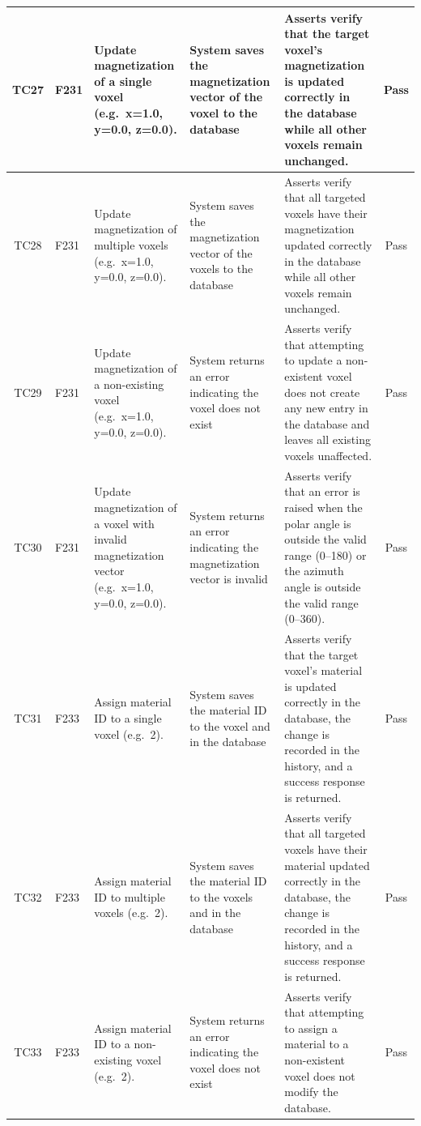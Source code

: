 \documentclass[12pt, titlepage]{article}
\begin{document}
\begin{longtable}{c
    >{\raggedright\arraybackslash}p{1.5cm}
    >{\raggedright\arraybackslash}p{3cm}
    >{\raggedright\arraybackslash}p{3cm}
  >{\raggedright\arraybackslash}p{4.5cm} c}
  TC27 & F231 & Update magnetization of a single voxel (e.g.\ x=1.0, y=0.0, z=0.0). & System saves the magnetization vector of the voxel to the database & Asserts verify that the target voxel's magnetization is updated correctly in the database while all other voxels remain unchanged. & \cellcolor{green} Pass \\ \midrule
  TC28 & F231 & Update magnetization of multiple voxels (e.g.\ x=1.0, y=0.0, z=0.0). & System saves the magnetization vector of the voxels to the database & Asserts verify that all targeted voxels have their magnetization updated correctly in the database while all other voxels remain unchanged. & \cellcolor{green} Pass \\ \midrule
  TC29 & F231 & Update magnetization of a non-existing voxel (e.g.\ x=1.0, y=0.0, z=0.0). & System returns an error indicating the voxel does not exist & Asserts verify that attempting to update a non-existent voxel does not create any new entry in the database and leaves all existing voxels unaffected. & \cellcolor{green} Pass \\ \midrule
  TC30 & F231 & Update magnetization of a voxel with invalid magnetization vector (e.g.\ x=1.0, y=0.0, z=0.0). & System returns an error indicating the magnetization vector is invalid & Asserts verify that an error is raised when the polar angle is outside the valid range (0--180) or the azimuth angle is outside the valid range (0--360). & \cellcolor{green} Pass \\ \midrule
  TC31 & F233 & Assign material ID to a single voxel (e.g.\ 2). & System saves the material ID to the voxel and in the database & Asserts verify that the target voxel's material is updated correctly in the database, the change is recorded in the history, and a success response is returned. & \cellcolor{green} Pass \\ \midrule
  TC32 & F233 & Assign material ID to multiple voxels (e.g.\ 2). & System saves the material ID to the voxels and in the database & Asserts verify that all targeted voxels have their material updated correctly in the database, the change is recorded in the history, and a success response is returned. & \cellcolor{green} Pass \\ \midrule
  TC33 & F233 & Assign material ID to a non-existing voxel (e.g.\ 2). & System returns an error indicating the voxel does not exist & Asserts verify that attempting to assign a material to a non-existent voxel does not modify the database. & \cellcolor{green} Pass \\ \midrule 

\end{longtable}
\end{document}
